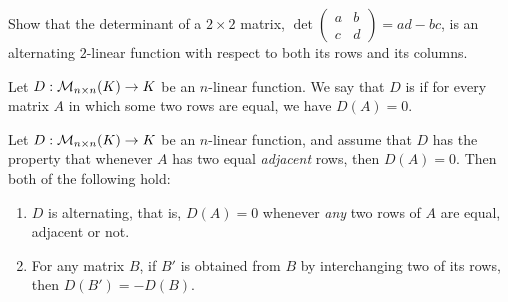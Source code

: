 \begin{exercise}
\label{exc:det_2x2_alternating_bilinear}
Show that the determinant of a $2 \times 2$ matrix, $\det \left(\begin{smallmatrix} a & b \\ c & d \end{smallmatrix}\right) = ad - bc$, is an alternating $2$-linear function with respect to both its rows and its columns.
\end{exercise}

\begin{definition}\label{def:alternating_func}
  Let $D : \mathcal{M}_{n \times n}(K) \to K$ be an $n$-linear function. We say that $D$ is  if for every matrix $A$ in which some two rows are equal, we have $D(A) = 0$.
\end{definition}

\begin{proposition}\label{prop:alternating_swap}
  Let $D : \mathcal{M}_{n \times n}(K) \to K$ be an $n$-linear function, and assume that $D$ has the property that whenever $A$ has two equal \emph{adjacent} rows, then $D(A) = 0$. Then both of the following hold:
  \begin{enumerate}[label=\textbf{(\alph*)}]
    \item $D$ is alternating, that is, $D(A) = 0$ whenever \emph{any} two rows of $A$ are equal, adjacent or not.
    \item For any matrix $B$, if $B'$ is obtained from $B$ by interchanging two of its rows, then $D(B') = -D(B)$.
  \end{enumerate}
\end{proposition}

